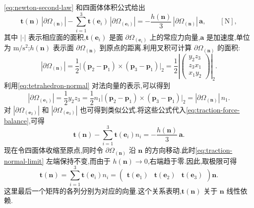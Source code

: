 \begin{note}
\cref{eq:newton-second-law} 和四面体体积公式给出
\begin{equation}\label{eq:traction-force-balance}
  \bm{t}(\bm{n})\,|\partial\Omega_{(\bm{n})}|
  -\sum_{i=1}^{3}\bm{t}(\bm{e}_i)\,|\partial\Omega_{(\bm{e}_i)}|
  =-\frac{h(\bm{n})}{3}\,|\partial\Omega_{(\bm{n})}|\,\bm{a},
  \qquad[\mathrm{N}],
\end{equation}
其中 $|\cdot|$ 表示相应面的面积,$\bm{t}(\bm{e}_i)$ 是面 $\partial\Omega_{(\bm{e}_i)}$ 上的常应力向量,$\bm{a}$ 是加速度,单位为 $\mathrm{m}/\mathrm{s}^2$;$h(\bm{n})$ 表示面 $\partial\Omega_{(\bm{n})}$ 到原点的距离.利用叉积可计算 $\partial\Omega_{(\bm{n})}$ 的面积:
\begin{equation*}
  |\partial\Omega_{(\bm{n})}|
  =\frac{1}{2}\bigl|(\bm{p}_2-\bm{p}_1)\times(\bm{p}_3-\bm{p}_1)\bigr|_2
  =\frac{1}{2}\left|\begin{pmatrix}y_2z_3\\z_3x_1\\x_1y_2\end{pmatrix}\right|_2.
\end{equation*}
利用\cref{eq:tetrahedron-normal} 对法向量的表示,可以得到
\begin{equation*}
  |\partial\Omega_{(\bm{e}_1)}|
  =\frac{1}{2}y_2z_3
  =\frac{1}{2}n_1\bigl|(\bm{p}_2-\bm{p}_1)\times(\bm{p}_3-\bm{p}_1)\bigr|_2
  =|\partial\Omega_{(\bm{n})}|\,n_1.
\end{equation*}
对 $|\partial\Omega_{(\bm{e}_2)}|$ 和 $|\partial\Omega_{(\bm{e}_3)}|$ 也可得到类似公式.将这些公式代入\cref{eq:traction-force-balance},可得
\begin{equation}\label{eq:traction-normal-limit}
  \bm{t}(\bm{n})-\sum_{i=1}^{3}\bm{t}(\bm{e}_i)n_i
  =-\frac{h(\bm{n})}{3}\,\bm{a}.
\end{equation}
现在令四面体收缩至原点,同时令 $\partial\Omega_{(\bm{n})}$ 沿 $\bm{n}$ 的方向移动.此时\cref{eq:traction-normal-limit} 左端保持不变,而由于 $h(\bm{n})\to0$,右端趋于零.因此,取极限可得
\begin{equation*}
  \bm{t}(\bm{n})
  =\sum_{i=1}^{3}\bm{t}(\bm{e}_i)n_i
  =\begin{pmatrix}\bm{t}(\bm{e}_1)&\bm{t}(\bm{e}_2)&\bm{t}(\bm{e}_3)\end{pmatrix}\bm{n}.
\end{equation*}
这里最后一个矩阵的各列分别为对应的向量.这个关系表明,$\bm{t}(\bm{n})$ 关于 $\bm{n}$ 线性依赖.


\end{note}
